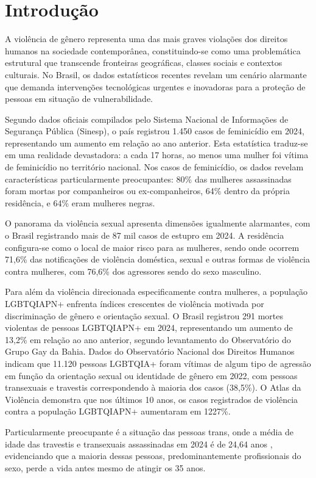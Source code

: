 \chapter{Introdução}\label{sec:introducao}
A violência de gênero representa uma das mais graves violações dos direitos humanos na sociedade contemporânea, constituindo-se como uma problemática estrutural que transcende fronteiras geográficas, classes sociais e contextos culturais. No Brasil, os dados estatísticos recentes revelam um cenário alarmante que demanda intervenções tecnológicas urgentes e inovadoras para a proteção de pessoas em situação de vulnerabilidade.

Segundo dados oficiais compilados pelo Sistema Nacional de Informações de Segurança Pública (Sinesp), o país registrou 1.450 casos de feminicídio em 2024, representando um aumento em relação ao ano anterior. Esta estatística traduz-se em uma realidade devastadora: a cada 17 horas, ao menos uma mulher foi vítima de feminicídio no território nacional. Nos casos de feminicídio, os dados revelam características particularmente preocupantes: 80\% das mulheres assassinadas foram mortas por companheiros ou ex-companheiros, 64\% dentro da própria residência, e 64\% eram mulheres negras.

O panorama da violência sexual apresenta dimensões igualmente alarmantes, com o Brasil registrando mais de 87 mil casos de estupro em 2024. A residência configura-se como o local de maior risco para as mulheres, sendo onde ocorrem 71,6\% das notificações de violência doméstica, sexual e outras formas de violência contra mulheres, com 76,6\% dos agressores sendo do sexo masculino.

Para além da violência direcionada especificamente contra mulheres, a população LGBTQIAPN+ enfrenta índices crescentes de violência motivada por discriminação de gênero e orientação sexual. O Brasil registrou 291 mortes violentas de pessoas LGBTQIAPN+ em 2024, representando um aumento de 13,2\% em relação ao ano anterior, segundo levantamento do Observatório do Grupo Gay da Bahia. Dados do Observatório Nacional dos Direitos Humanos indicam que 11.120 pessoas LGBTQIA+ foram vítimas de algum tipo de agressão em função da orientação sexual ou identidade de gênero em 2022, com pessoas transexuais e travestis correspondendo à maioria dos casos (38,5\%). O Atlas da Violência demonstra que nos últimos 10 anos, os casos registrados de violência contra a população LGBTQIAPN+ aumentaram em 1227\%.

Particularmente preocupante é a situação das pessoas trans, onde a média de idade das travestis e transexuais assassinadas em 2024 é de 24,64 anos \cite{antra2024dossiê}, evidenciando que a maioria dessas pessoas, predominantemente profissionais do sexo, perde a vida antes mesmo de atingir os 35 anos.

